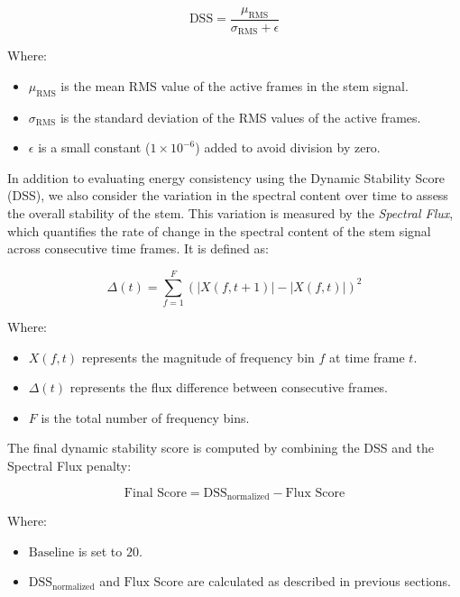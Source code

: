 \documentclass[10pt,twocolumn]{article}
\begin{document}
\begin{equation}
    \text{DSS} = \frac{\mu_{\text{RMS}}}{\sigma_{\text{RMS}} + \epsilon}
\end{equation}

Where:
\begin{itemize}
    \item $\mu_{\text{RMS}}$ is the mean RMS value of the active frames in the stem signal.
    \item $\sigma_{\text{RMS}}$ is the standard deviation of the RMS values of the active frames.
    \item $\epsilon$ is a small constant ($1 \times 10^{-6}$) added to avoid division by zero.
\end{itemize}



In addition to evaluating energy consistency using the Dynamic Stability Score (DSS), we also consider the variation in the spectral content over time to assess the overall stability of the stem. This variation is measured by the \textit{Spectral Flux}, which quantifies the rate of change in the spectral content of the stem signal across consecutive time frames. It is defined as:

\begin{equation}
    \Delta(t) = \sum_{f=1}^{F} \left( |X(f, t+1)| - |X(f, t)| \right)^2
\end{equation}

Where:
\begin{itemize}
    \item $X(f, t)$ represents the magnitude of frequency bin $f$ at time frame $t$.
    \item $\Delta(t)$ represents the flux difference between consecutive frames.
    \item $F$ is the total number of frequency bins.
\end{itemize}


The final dynamic stability score is computed by combining the DSS and the Spectral Flux penalty:

\begin{equation}
    \text{Final Score} = \text{DSS}_{\text{normalized}} - \text{Flux Score} 
\end{equation}

Where:
\begin{itemize}
    \item $\text{Baseline}$ is set to $20$.
    \item $\text{DSS}_{\text{normalized}}$ and $\text{Flux Score}$ are calculated as described in previous sections.
\end{itemize}
\end{document}

